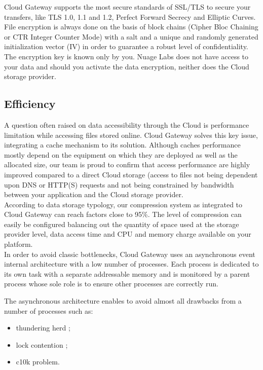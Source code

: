 \documentclass[11pt,fleqn,openany]{book} %
\begin{document}
Cloud Gateway supports the most secure standards of SSL/TLS to secure your transfers, like TLS 1.0, 1.1 and 1.2, Perfect Forward Secrecy and Elliptic Curves.\\

File encryption is always done on the basis of block chains (Cipher Bloc Chaining or CTR Integer Counter Mode) with a salt and a unique and randomly generated initialization vector (IV) in order to guarantee a robust level of confidentiality. The encryption key is known only by you. Nuage Labs does not have access to your data and should you activate the data encryption, neither does the Cloud storage provider.

\subsection{Efficiency}

A question often raised on data accessibility through the Cloud is performance limitation while accessing files stored online. Cloud Gateway solves this key issue, integrating a cache mechanism to its solution. Although caches performance mostly depend on the equipment on which they are deployed as well as the allocated size, our team is proud to confirm that access performance are highly improved compared to a direct Cloud storage (access to files not being dependent upon DNS or HTTP(S) requests and not being constrained by bandwidth between your application and the Cloud storage provider.\\

According to data storage typology, our compression system as integrated to Cloud Gateway can reach factors close to 95\%.
The level of compression can easily be configured balancing out the quantity of space used at the storage provider level, data access time and CPU and memory charge available on your platform.\\

In order to avoid classic bottlenecks, Cloud Gateway uses an asynchronous event internal architecture with a low number of processes.
Each process is dedicated to its own task with a separate addressable memory and is monitored by a parent process whose sole role is to ensure other processes are correctly run.

The asynchronous architecture enables to avoid almost all drawbacks from a number of processes such as:
\begin{itemize}
\item thundering herd ;
\item lock contention ;
\item c10k problem.
\end{itemize}
\end{document}
